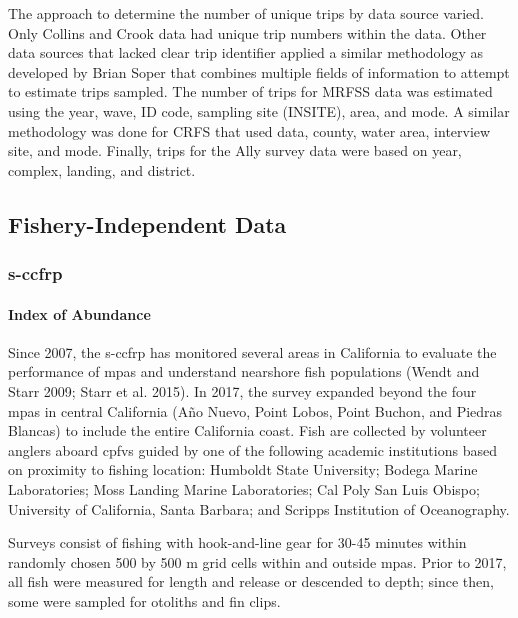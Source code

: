 \documentclass[11pt,
  english,
  letterpaper,
]{article}
\begin{document}
The approach to determine the number of unique trips by data source varied. Only Collins and Crook data had unique trip numbers within the data. Other data sources that lacked clear trip identifier applied a similar methodology as developed by Brian Soper that combines multiple fields of information to attempt to estimate trips sampled. The number of trips for MRFSS data was estimated using the year, wave, ID code, sampling site (INSITE), area, and mode. A similar methodology was done for CRFS that used data, county, water area, interview site, and mode. Finally, trips for the Ally survey data were based on year, complex, landing, and district.

\hypertarget{fishery-independent-data}{%
\subsection{Fishery-Independent Data}\label{fishery-independent-data}}

\hypertarget{section}{%
\subsubsection{\texorpdfstring{\acrlong{s-ccfrp}}{}}\label{section}}

\hypertarget{index-of-abundance}{%
\paragraph{Index of Abundance}\label{index-of-abundance}}

Since 2007, the \gls{s-ccfrp} has monitored several areas in California to evaluate the performance of \glspl{mpa} and understand nearshore fish populations (Wendt and Starr 2009; Starr et al. 2015). In 2017, the survey expanded beyond the four \Gls{mpa}s in central California (Año Nuevo, Point Lobos, Point Buchon, and Piedras Blancas) to include the entire California coast. Fish are collected by volunteer anglers aboard \glspl{cpfv} guided by one of the following academic institutions based on proximity to fishing location: Humboldt State University; Bodega Marine Laboratories; Moss Landing Marine Laboratories; Cal Poly San Luis Obispo; University of California, Santa Barbara; and Scripps Institution of Oceanography.

Surveys consist of fishing with hook-and-line gear for 30-45 minutes within randomly chosen 500 by 500 m grid cells within and outside \glspl{mpa}. Prior to 2017, all fish were measured for length and release or descended to depth; since then, some were sampled for otoliths and fin clips.
\end{document}
